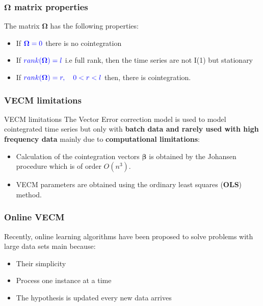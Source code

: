 \documentclass{beamer}
\begin{document}
\begin{frame}
\frametitle{$\boldsymbol \Omega$ matrix properties}
The matrix $\boldsymbol \Omega$ has the following properties:
\begin{itemize}
\item If ${\color{blue}\boldsymbol \Omega = 0}$ there is no cointegration
\item If ${\color{blue}rank(\boldsymbol\Omega)=l}$ i.e full rank, then the time series are not
I(1) but stationary
\item If ${\color{blue}rank(\boldsymbol\Omega)=r,\quad 0 < r < l}$ then, there is cointegration.
\end{itemize}
\end{frame}


\begin{frame}
\frametitle{VECM limitations}

\begin{alertblock}{VECM limitations}
The Vector Error correction model is used to model cointegrated time series but only with {\bf batch data and rarely used with high frequency data} mainly due to {\bf computational limitations}:
\begin{itemize}
\item Calculation of the cointegration vectors $\boldsymbol \beta$ is obtained by the Johansen procedure which is of order $O(n^3)$.
\item VECM parameters are obtained using the ordinary least squares ({\bf OLS}) method.
\end{itemize}
\end{alertblock}
\end{frame}

\begin{frame}
\frametitle{Online VECM}
Recently, online learning algorithms have been proposed to solve problems with large data sets main because: 
\begin{itemize}
\item Their simplicity
\item Process one instance at a time
\item The hypothesis is updated every new data arrives
\end{itemize} 
\end{frame}
\end{document}
